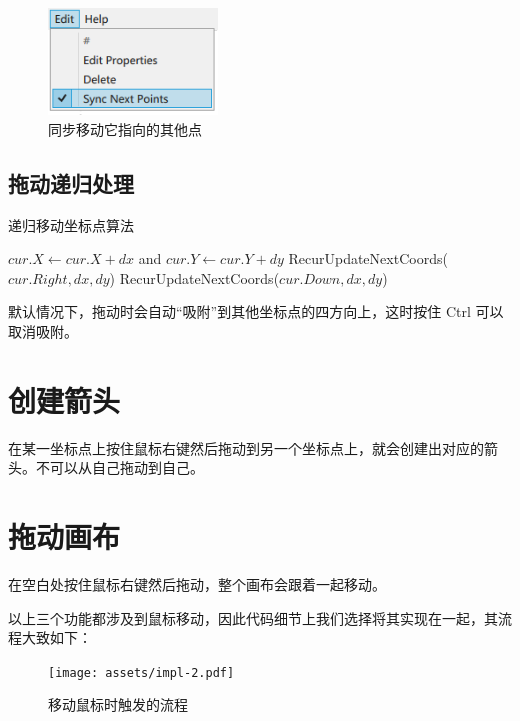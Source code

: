 \begin{figure}[H]
  \centering
  \includegraphics[width=0.4\textwidth]{assets/sync.png}
  \caption{同步移动它指向的其他点}
  \label{fig:sync}
\end{figure}

\subsection{拖动递归处理}

\begin{algorithm}[htbp]
  \caption{递归移动坐标点算法}
  \begin{algorithmic}[1]
    \State $cur.X \gets cur.X + dx$ and $cur.Y \gets cur.Y + dy$
      \State RecurUpdateNextCoords($cur.Right, dx, dy$)
    \EndIf
      \State RecurUpdateNextCoords($cur.Down, dx, dy$)
    \EndIf
    \EndProcedure
  \end{algorithmic}
\end{algorithm}

默认情况下，拖动时会自动``吸附''到其他坐标点的四方向上，这时按住 Ctrl 可以取消吸附。

\section{创建箭头}

在某一坐标点上按住鼠标右键然后拖动到另一个坐标点上，就会创建出对应的箭头。不可以从自己拖动到自己。

\section{拖动画布}

在空白处按住鼠标右键然后拖动，整个画布会跟着一起移动。

以上三个功能都涉及到鼠标移动，因此代码细节上我们选择将其实现在一起，其流程大致如下：

\begin{figure}[H]
    \centering
    \texttt{[image: assets/impl-2.pdf]}
    \caption{移动鼠标时触发的流程}
    \label{fig:impl-2}
\end{figure}

